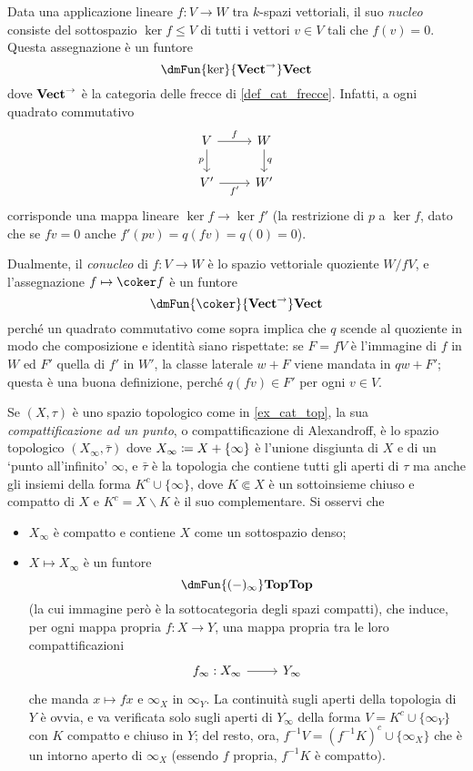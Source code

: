 \begin{example}
	Data una applicazione lineare $f : V\to W$ tra $k$-spazi vettoriali, il suo \emph{nucleo} consiste del sottospazio $\ker f\le V$ di tutti i vettori $v\in V$ tali che $f(v)=0$. Questa assegnazione è un funtore 
	\[\dmFun{\ker}{\ctVect^\to}\ctVect\]
	dove $\mathbf{Vect}^\to$ è la categoria delle frecce di \ref{def_cat_frecce}. Infatti, a ogni quadrato commutativo 
	\[\begin{tikzcd}
		V \ar[r, "f"]\ar[d, "p"']& W\ar[d, "q"] \\ 
		V' \ar[r, "{f'}"'] & W'
	\end{tikzcd}\]
	corrisponde una mappa lineare $\ker f \to \ker f'$ (la restrizione di $p$ a $\ker f$, dato che se $fv=0$ anche $f'(pv)=q(fv)=q(0)=0$).

	Dualmente, il \emph{conucleo} di $f : V\to W$ è lo spazio vettoriale quoziente $W/fV$, e l'assegnazione $f\mapsto \coker f$ è un funtore 
	\[\dmFun{\coker}{\ctVect^\to}\ctVect\]
	perché un quadrato commutativo come sopra implica che $q$ scende al quoziente in modo che composizione e identità siano rispettate: se $F = fV$ è l'immagine di $f$ in $W$ ed $F'$ quella di $f'$ in $W'$, la classe laterale $w + F$ viene mandata in $qw+F'$; questa è una buona definizione, perché $q(fv) \in F'$ per ogni $v\in V$.
\end{example}
\begin{example}
	Se $(X,\tau)$ è uno spazio topologico come in \ref{ex_cat_top}, la sua \emph{compattificazione ad un punto}, o compattificazione di Alexandroff, è lo spazio topologico $(X_\infty,\bar\tau)$ dove $X_\infty \coloneqq X + \{\infty\}$ è l'unione disgiunta di $X$ e di un `punto all'infinito' $\infty$, e $\bar\tau$ è la topologia che contiene tutti gli aperti di $\tau$ ma anche gli insiemi della forma $K^c \cup \{\infty\}$, dove $K\Subset X$ è un sottoinsieme chiuso e compatto di $X$ e $K^c = X\smallsetminus K$ è il suo complementare. Si osservi che 
	\begin{itemize}
		\item $X_\infty$ è compatto e contiene $X$ come un sottospazio denso;
		\item $X\mapsto  X_\infty$ è un funtore 
		\[\dmFun{(-)_\infty}\ctTop\ctTop\]
		(la cui immagine però è la sottocategoria degli spazi compatti), che induce, per ogni mappa propria $f : X\to Y$, una mappa propria tra le loro compattificazioni 
		\[\begin{tikzcd}
			f_\infty : X_\infty \ar[r] & Y_\infty
		\end{tikzcd}\]
		che manda $x\mapsto fx$ e $\infty_X$ in $\infty_Y$. La continuità sugli aperti della topologia di $Y$ è ovvia, e va verificata solo sugli aperti di $Y_\infty$ della forma $V=K^c\cup\{\infty_Y\}$ con $K$ compatto e chiuso in $Y$; del resto, ora, $f^{-1}V = (f^{-1}K)^c \cup \{\infty_X\}$ che è un intorno aperto di $\infty_X$ (essendo $f$ propria, $f^{-1}K$ è compatto).
	\end{itemize}
\end{example}
